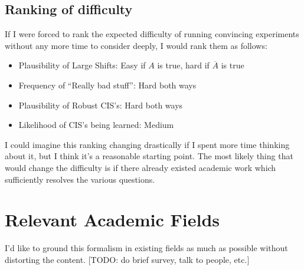 \documentclass{article}
\begin{document}
\subsection{Ranking of difficulty}
If I were forced to rank the expected difficulty of running convincing experiments without any more time to consider deeply, I would rank them as follows:
\begin{itemize}
    \item Plausibility of Large Shifts: Easy if $A$ is true, hard if $\overline{A}$ is true
    \item Frequency of ``Really bad stuff”: Hard both ways
    \item Plausibility of Robust CIS's: Hard both ways
    \item Likelihood of CIS's being learned: Medium
\end{itemize}
I could imagine this ranking changing drastically if I spent more time thinking about it, but I think it’s a reasonable starting point. The most likely thing that would change the difficulty is if there already existed academic work which sufficiently resolves the various questions. 
\section{Relevant Academic Fields}
I'd like to ground this formalism in existing fields as much as possible without distorting the content. [TODO: do brief survey, talk to people, etc.]
\end{document}

